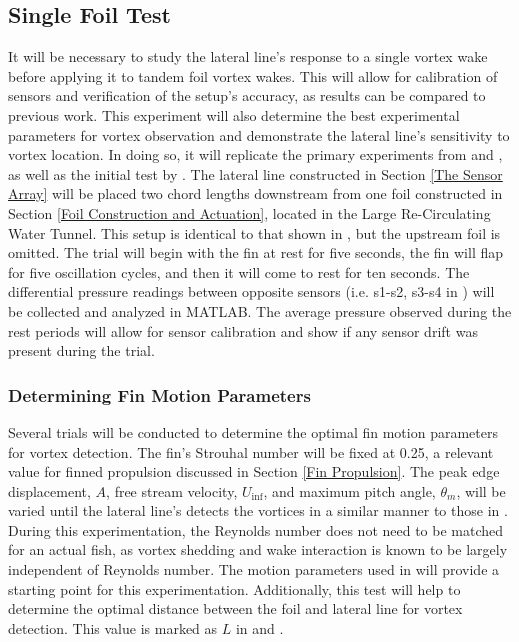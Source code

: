 \subsection{Single Foil Test} \label{Single Foil Test}
    
    It will be necessary to study the lateral line's response to a single vortex wake before applying it to tandem foil vortex wakes. This will allow for calibration of sensors and verification of the setup's accuracy, as results can be compared to previous work. This experiment will also determine the best experimental parameters for vortex observation and demonstrate the lateral line's sensitivity to vortex location. In doing so, it will replicate the primary experiments from \citep{Venturelli2012} and \citep{Chambers2014}, as well as the initial test by \citep{Boschitsch2014}. The lateral line constructed in Section \ref{The Sensor Array} will be placed two chord lengths downstream from one foil constructed in Section \ref{Foil Construction and Actuation}, located in the Large Re-Circulating Water Tunnel. This setup is identical to that shown in , but the upstream foil is omitted. The trial will begin with the fin at rest for five seconds, the fin will flap for five oscillation cycles, and then it will come to rest for ten seconds. The differential pressure readings between opposite sensors (i.e. s1-s2, s3-s4 in ) will be collected and analyzed in MATLAB. The average pressure observed during the rest periods will allow for sensor calibration and show if any sensor drift was present during the trial.
    
\subsubsection{Determining Fin Motion Parameters} \label{Determining Fin Motion Parameters}
    
    Several trials will be conducted to determine the optimal fin motion parameters for vortex detection. The fin's Strouhal number will be fixed at 0.25, a relevant value for finned propulsion discussed in Section \ref{Fin Propulsion}. The peak edge displacement, \(A\), free stream velocity, \(U_\inf\), and maximum pitch angle, \(\theta_m\), will be varied until the lateral line's detects the vortices in a similar manner to those in . During this experimentation, the Reynolds number does not need to be matched for an actual fish, as vortex shedding and wake interaction is known to be largely independent of Reynolds number. The motion parameters used in \citep{Boschitsch2014} will provide a starting point for this experimentation. Additionally, this test will help to determine the optimal distance between the foil and lateral line for vortex detection. This value is marked as $L$ in  and .
    
